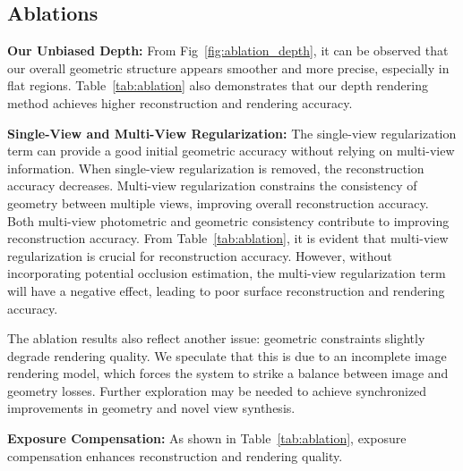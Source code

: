 \documentclass[lettersize,journal]{IEEEtran}
\begin{document}

\subsection{Ablations}

\textbf{Our Unbiased Depth:}
From Fig~\ref{fig:ablation_depth}, it can be observed that our overall geometric structure appears smoother and more precise, especially in flat regions. Table~\ref{tab:ablation} also demonstrates that our depth rendering method achieves higher reconstruction and rendering accuracy.



\textbf{Single-View and Multi-View Regularization:}
The single-view regularization term can provide a good initial geometric accuracy without relying on multi-view information. When single-view regularization is removed, the reconstruction accuracy decreases. Multi-view regularization constrains the consistency of geometry between multiple views, improving overall reconstruction accuracy. Both multi-view photometric and geometric consistency contribute to improving reconstruction accuracy. From Table~\ref{tab:ablation}, it is evident that multi-view regularization is crucial for reconstruction accuracy. \textcolor{r}{However, without incorporating potential occlusion estimation, the multi-view regularization term will have a negative effect, leading to poor surface reconstruction and rendering accuracy.}

The ablation results also reflect another issue: geometric constraints slightly degrade rendering quality. We speculate that this is due to an incomplete image rendering model, which forces the system to strike a balance between image and geometry losses. Further exploration may be needed to achieve synchronized improvements in geometry and novel view synthesis.


% 
\textbf{Exposure Compensation:}
As shown in Table~\ref{tab:ablation}, exposure compensation enhances reconstruction and rendering quality.
\end{document}
